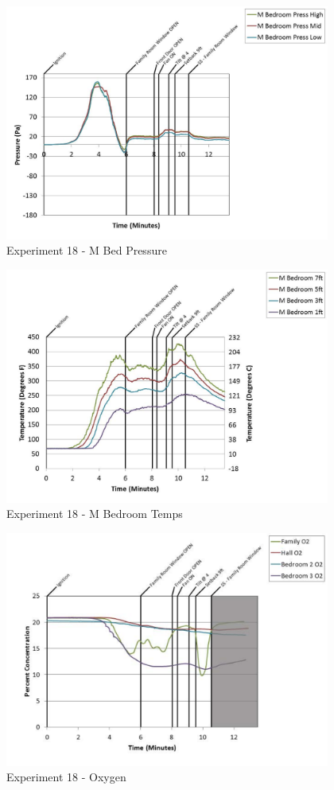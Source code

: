 \documentclass{article}
\begin{document}
\begin{appendices}
	\clearpage

	\begin{figure}[h!]
		\centering
		\includegraphics[height=3.05in]{0_Images/Results_Charts/Exp_18_Charts/MBedPressure.pdf}
		\caption{Experiment 18 - M Bed Pressure}
	\end{figure}
 

	\begin{figure}[h!]
		\centering
		\includegraphics[height=3.05in]{0_Images/Results_Charts/Exp_18_Charts/MBedroomTemps.pdf}
		\caption{Experiment 18 - M Bedroom Temps}
	\end{figure}
 
	\clearpage

	\begin{figure}[h!]
		\centering
		\includegraphics[height=3.05in]{0_Images/Results_Charts/Exp_18_Charts/Oxygen.pdf}
		\caption{Experiment 18 - Oxygen}
	\end{figure}
 


\end{appendices}
\end{document}
